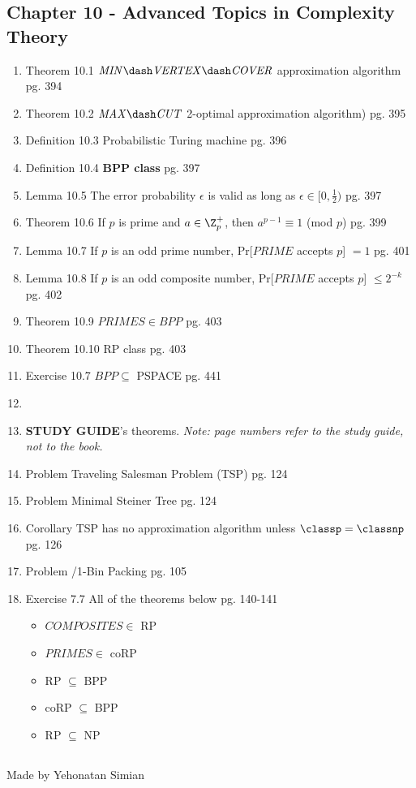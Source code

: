 \documentclass[12pt]{article} %
\newcommand{\theoremitem}[3]{\item #1 \quad #2 \dotfill #3}
\newenvironment{theoremlist} {
    \begin{enumerate}[nosep,leftmargin=*,label={}]
} {
    \end{enumerate}
}
\begin{document}
\subsection{Chapter 10 - Advanced Topics in Complexity Theory}
\begin{theoremlist}
    \theoremitem{Theorem 10.1}
    {$\mathit{MIN\dash VERTEX\dash COVER}$ approximation algorithm}
    {pg. 394}
    \theoremitem{Theorem 10.2}
    {$\mathit{MAX\dash CUT}$ 2-optimal approximation algorithm)}
    {pg. 395}
    \theoremitem{Definition 10.3}
    {Probabilistic Turing machine}
    {pg. 396}
    \theoremitem{Definition 10.4}
    {\textbf{BPP class}}
    {pg. 397}
    \theoremitem{Lemma 10.5}
    {The error probability $\epsilon$ is valid as long as $\epsilon\in[0,\frac{1}{2})$}
    {pg. 397}
    \theoremitem{Theorem 10.6}
    {If $p$ is prime and $a\in\Z_p^+$, then $a^{p-1}\equiv1$ (mod $p$)}
    {pg. 399}
    \theoremitem{Lemma 10.7}
    {If $p$ is an odd prime number, Pr[$\mathit{PRIME}$ accepts $p$] $=1$}
    {pg. 401}
    \theoremitem{Lemma 10.8}
    {If $p$ is an odd composite number, Pr[$\mathit{PRIME}$ accepts $p$] $\leq 2^{-k}$}
    {pg. 402}
    \theoremitem{Theorem 10.9}
    {$\mathit{PRIMES}\in\mathit{BPP}$}
    {pg. 403}
    \theoremitem{Theorem 10.10}
    {RP class}
    {pg. 403}
    \theoremitem{Exercise 10.7}
    {$\mathit{BPP}\subseteq$ PSPACE}
    {pg. 441}

    \item[]
    \item[]
    \textbf{STUDY GUIDE}'s theorems. \textit{Note: page numbers refer to the study guide, not to the book.}
    \theoremitem{Problem}
    {Traveling Salesman Problem (TSP)}
    {pg. 124}
    \theoremitem{Problem}
    {Minimal Steiner Tree}
    {pg. 124}
    \theoremitem{Corollary}
    {TSP has no approximation algorithm unless $\classp=\classnp$}
    {pg. 126}
    \theoremitem{Problem}
    {0/1-Bin Packing}
    {pg. 105}
    \theoremitem{Exercise 7.7}
    {All of the theorems below}
    {pg. 140-141}
    \begin{multicols}{2}
    \begin{itemize}[nosep]
        \item $\mathit{COMPOSITES}\in$ RP
        \item $\mathit{PRIMES}\in$ coRP
        \item RP $\subseteq$ BPP
        \item coRP $\subseteq$ BPP
        \item RP $\subseteq$ NP
    \end{itemize}
    \end{multicols}
\end{theoremlist}

\subsection{}
\begin{center}
\vspace*{\fill}
Made by Yehonatan Simian
\end{center}



\end{document}
